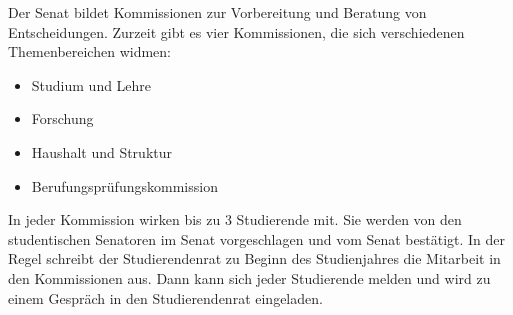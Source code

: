 Der Senat bildet Kommissionen zur Vorbereitung und Beratung von Entscheidungen.
Zurzeit gibt es vier Kommissionen, die sich verschiedenen Themenbereichen widmen:

\begin{itemize}
    \item Studium und Lehre
    \item Forschung
    \item Haushalt und Struktur
    \item Berufungsprüfungskommission
\end{itemize}

In jeder Kommission wirken bis zu 3 Studierende mit.
Sie werden von den studentischen Senatoren im Senat vorgeschlagen und vom Senat bestätigt.
In der Regel schreibt der Studierendenrat zu Beginn des Studienjahres die Mitarbeit in den Kommissionen aus.
Dann kann sich jeder Studierende melden und wird zu einem Gespräch in den Studierendenrat eingeladen.


